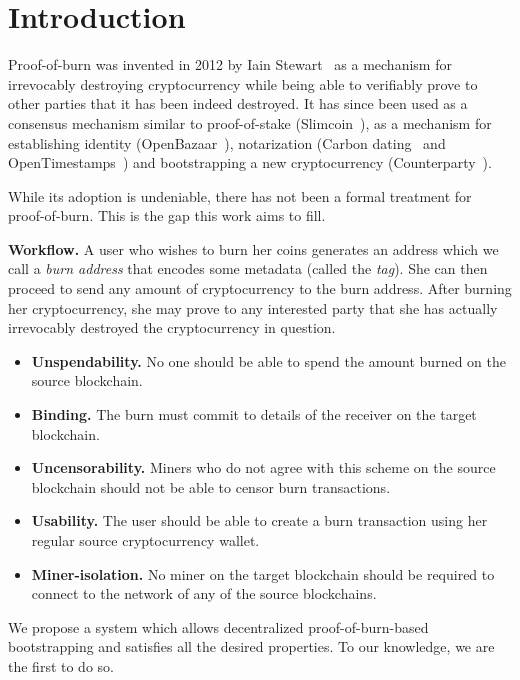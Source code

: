 \section{Introduction}\label{section:introduction}
Proof-of-burn was invented in 2012 by Iain Stewart~\cite{stewart} as a mechanism for irrevocably destroying cryptocurrency while being able to verifiably prove to other parties that it has been indeed destroyed. It has since been used as a consensus mechanism similar to proof-of-stake (Slimcoin~\cite{slimcoin}), as a mechanism for establishing identity (OpenBazaar~\cite{zindros2016trust}), notarization (Carbon dating~\cite{clark2012commitcoin} and OpenTimestamps~\cite{todd2016opentimestamps}) and bootstrapping a new cryptocurrency (Counterparty~\cite{counterparty}).

While its adoption is undeniable, there has not been a formal treatment for proof-of-burn. This is the gap this work aims to fill.

\noindent
\textbf{Workflow.}
A user who wishes to burn her coins generates an address which we call a \emph{burn address} that encodes some metadata (called the \emph{tag}). She can then proceed to send any amount of cryptocurrency to the burn address. After burning her cryptocurrency, she may prove to any interested party that she has actually irrevocably destroyed the cryptocurrency in question.

\begin{itemize}
    \item \textbf{Unspendability.} No one should be able to spend the amount burned on the source blockchain.
    \item \textbf{Binding.} The burn must commit to details of the receiver on the target blockchain.
    \item \textbf{Uncensorability.} Miners who do not agree with this scheme on the source blockchain should not be able to censor burn transactions.
    \item \textbf{Usability.} The user should be able to create a burn transaction using her regular source cryptocurrency wallet.
    \item \textbf{Miner-isolation.} No miner on the target blockchain should be required to connect to the network of any of the source blockchains. %
\end{itemize}

We propose a system which allows decentralized proof-of-burn-based bootstrapping and satisfies all the desired properties. To our knowledge, we are the first to do so.


